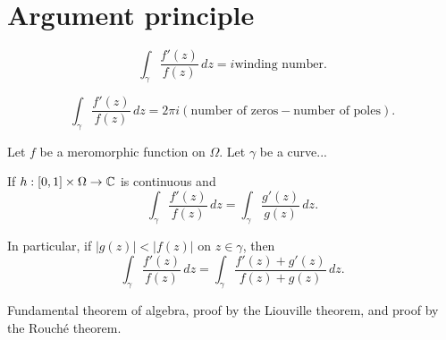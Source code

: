 \documentclass{../note}
\begin{document}
\begin{prb}

\end{prb}

\begin{prb}

\end{prb}

\begin{prb}

\end{prb}



\section{Argument principle}

\begin{prb}
\begin{parts}
\item
\[\int_\gamma\frac{f'(z)}{f(z)}\,dz=i\text{winding number}.\]
\item
\[\int_\gamma\frac{f'(z)}{f(z)}\,dz=2\pi i(\text{number of zeros}-\text{number of poles}).\]
\end{parts}
\end{prb}

\begin{prb}
Let $f$ be a meromorphic function on $\Omega$.
Let $\gamma$ be a curve...
\begin{parts}
\item
If $h:[0,1]\times\Omega\to\mathbb{C}$ is continuous and 
\[\int_\gamma\frac{f'(z)}{f(z)}\,dz=\int_\gamma\frac{g'(z)}{g(z)}\,dz.\]
\item
In particular, if $|g(z)|<|f(z)|$ on $z\in\gamma$, then
\[\int_\gamma\frac{f'(z)}{f(z)}\,dz=\int_\gamma\frac{f'(z)+g'(z)}{f(z)+g(z)}\,dz.\]
\end{parts}
\end{prb}


\begin{prb}
Fundamental theorem of algebra, proof by the Liouville theorem, and proof by the Rouch\'e theorem.
\end{prb}
\end{document}
